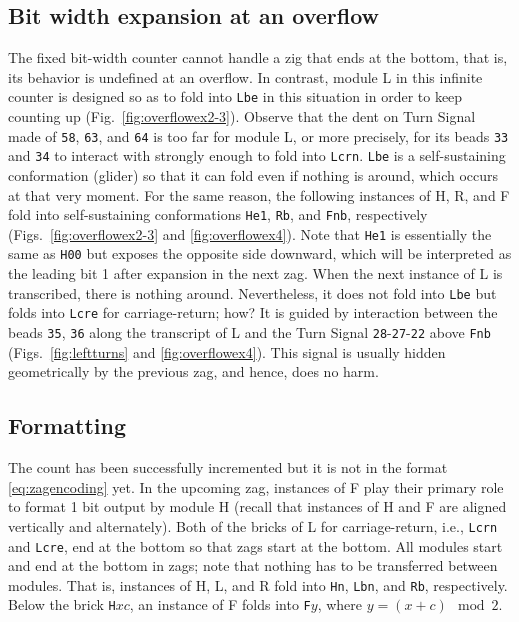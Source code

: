 \documentclass[twocolumn]{svjour3}
\begin{document}
\subsection{Bit width expansion at an overflow}
The fixed bit-width counter cannot handle a zig that ends at the bottom, that is, its behavior is undefined at an overflow.
In contrast, module L in this infinite counter is designed so as to fold into \texttt{Lbe} in this situation in order to keep counting up (Fig.~\ref{fig:overflowex2-3}).
Observe that the dent on Turn Signal made of \texttt{58}, \texttt{63}, and \texttt{64} is too far for module L, or more precisely, for its beads \texttt{33} and \texttt{34} to interact with strongly enough to fold into \texttt{Lcrn}.
\texttt{Lbe} is a self-sustaining conformation (glider) so that it can fold even if nothing is around, which occurs at that very moment.
For the same reason, the following instances of H, R, and F fold into self-sustaining conformations \texttt{He1}, \texttt{Rb}, and \texttt{Fnb}, respectively (Figs.~\ref{fig:overflowex2-3} and \ref{fig:overflowex4}).
Note that \texttt{He1} is essentially the same as \texttt{H00} but exposes the opposite side downward, which will be interpreted as the leading bit 1 after expansion in the next zag.
When the next instance of L is transcribed, there is nothing around.
Nevertheless, it does not fold into \texttt{Lbe} but folds into \texttt{Lcre} for carriage-return; how?
It is guided by interaction between the beads \texttt{35}, \texttt{36} along the transcript of L and the Turn Signal \texttt{28}{-}\texttt{27}{-}\texttt{22} above \texttt{Fnb} (Figs.~\ref{fig:leftturns} and \ref{fig:overflowex4}).
This signal is usually hidden geometrically by the previous zag, and hence, does no harm.


\subsection{Formatting}
The count has been successfully incremented but it is not in the format \eqref{eq:zagencoding} yet.
In the upcoming zag, instances of F play their primary role to format 1 bit output by module H (recall that instances of H and F are aligned vertically and alternately).
Both of the bricks of L for carriage-return, i.e., \texttt{Lcrn} and \texttt{Lcre}, end at the bottom so that zags start at the bottom.
All modules start and end at the bottom in zags; note that nothing has to be transferred between modules.
That is, instances of H, L, and R fold into \texttt{Hn}, \texttt{Lbn}, and \texttt{Rb}, respectively.
Below the brick \texttt{H}$xc$, an instance of F folds into \texttt{F}$y$, where $y = (x+c) \mod 2$.
\end{document}
